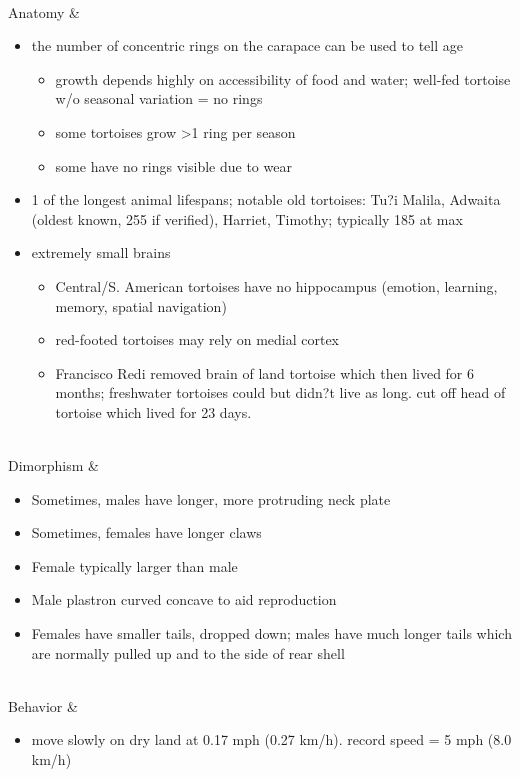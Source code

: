 \begin{center}
\begin{longtabu}
	 \\
	\hline
	Anatomy &
	\begin{itemize}[noitemsep]
		\item the number of concentric rings on the carapace can be used to tell age
			\begin{itemize}[noitemsep]
				\item growth depends highly on accessibility of food and water; well-fed tortoise w/o seasonal variation = no rings
				\item some tortoises grow >1 ring per season
				\item some have no rings visible due to wear
			\end{itemize}
		\item 1 of the longest animal lifespans; notable old tortoises: Tu?i Malila, Adwaita (oldest known, 255 if verified), Harriet, Timothy; typically 185 at max
		\item extremely small brains
			\begin{itemize}[noitemsep]
				\item Central/S. American tortoises have no hippocampus (emotion, learning, memory, spatial navigation)
				\item red-footed tortoises may rely on medial cortex
				\item Francisco Redi removed brain of land tortoise which then lived for 6 months; freshwater tortoises could but didn?t live as long. cut off head of tortoise which lived for 23 days.
			\end{itemize}
	\end{itemize}
	 \\
	\hline
	Dimorphism & 
	\begin{itemize}[noitemsep]
		\item Sometimes, males have longer, more protruding neck plate
		\item Sometimes, females have longer claws
		\item Female typically larger than male
		\item Male plastron curved concave to aid reproduction
		\item Females have smaller tails, dropped down; males have much longer tails which are normally pulled up and to the side of rear shell
	\end{itemize}
	\\
	\hline
	Behavior & 
	\begin{itemize}[noitemsep]
		\item move slowly on dry land at 0.17 mph (0.27 km/h). record speed = 5 mph (8.0 km/h)

\end{itemize}
\end{longtabu}
\end{center}
